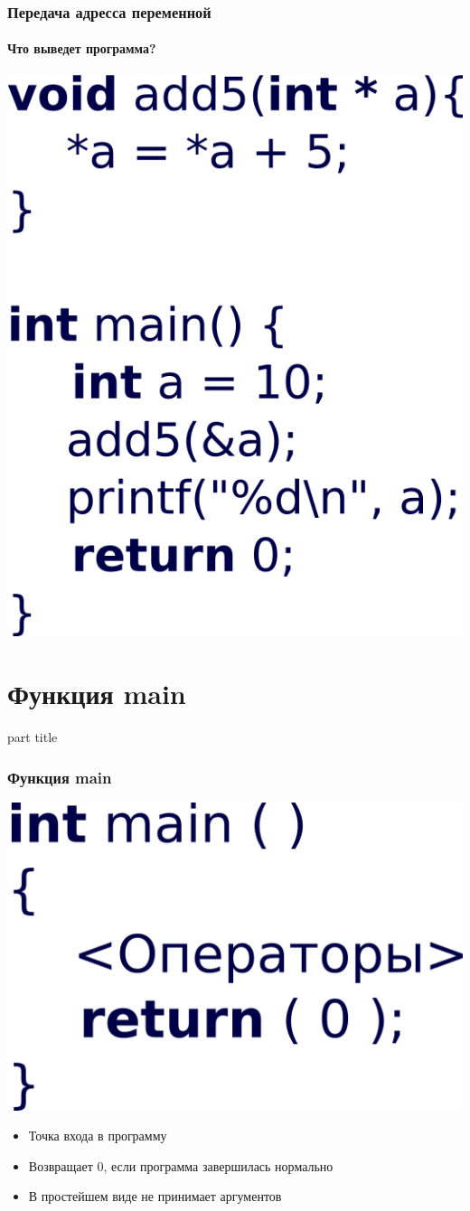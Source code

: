 \documentclass[14pt,pdf,hyperref={unicode}]{beamer}
\begin{document}
\begin{frame}[fragile]
\frametitle{Передача адресса переменной}
\framesubtitle{Что выведет программа?} 
\begin{center}
\includegraphics[width=0.4\linewidth]{images/function_passpointer.png}
\end{center}
\end{frame}


\section{Функция main}
\begin{frame}
\begin{center}
\begin{beamercolorbox}[sep=8pt,center]{part
title}
\insertsection
\end{beamercolorbox}
\end{center}
\end{frame}


\begin{frame}[fragile]
\frametitle{Функция main} 
\begin{center}
\includegraphics[width=0.35\linewidth]{images/function_syntax_main.png}
\end{center}
\begin{itemize}
\item Точка входа в программу
\item Возвращает 0, если программа завершилась нормально
\item В простейшем виде не принимает аргументов
\end{itemize}
\end{frame}
\end{document}
